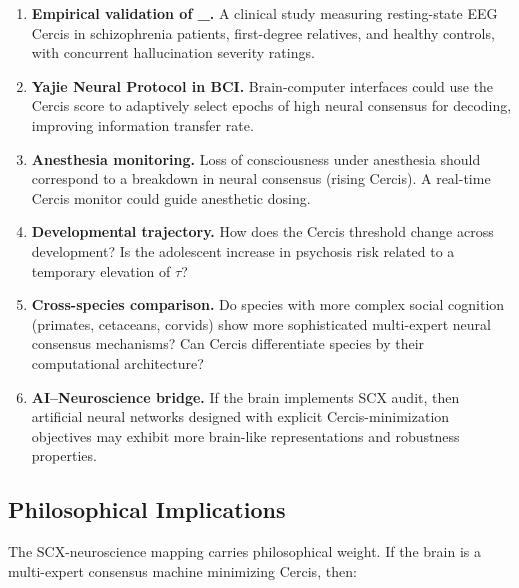 \documentclass[12pt,a4paper]{article}
\theoremstyle{remark}
\newcommand{\Cercis}{\textsf{Cercis}}
\newcommand{\SchizoScore}{\mathcal{S}_{\text{schizo}}}
\begin{document}
\begin{enumerate}[label=(\roman*)]
    \item \textbf{Empirical validation of \SchizoScore{}.}
          A clinical study measuring resting-state EEG \Cercis{} in
          schizophrenia patients, first-degree relatives, and healthy controls,
          with concurrent hallucination severity ratings.
    \item \textbf{Yajie Neural Protocol in BCI.}
          Brain-computer interfaces could use the \Cercis{} score to
          adaptively select epochs of high neural consensus for decoding,
          improving information transfer rate.
    \item \textbf{Anesthesia monitoring.}
          Loss of consciousness under anesthesia should correspond to a
          breakdown in neural consensus (rising \Cercis{}). A real-time
          \Cercis{} monitor could guide anesthetic dosing.
    \item \textbf{Developmental trajectory.}
          How does the \Cercis{} threshold change across development? Is the
          adolescent increase in psychosis risk related to a temporary
          elevation of $\tau$?
    \item \textbf{Cross-species comparison.}
          Do species with more complex social cognition (primates, cetaceans,
          corvids) show more sophisticated multi-expert neural consensus
          mechanisms? Can \Cercis{} differentiate species by their
          computational architecture?
    \item \textbf{AI--Neuroscience bridge.}
          If the brain implements SCX audit, then artificial neural networks
          designed with explicit \Cercis{}-minimization objectives may exhibit
          more brain-like representations and robustness properties.
\end{enumerate}

\subsection{Philosophical Implications}

The SCX-neuroscience mapping carries philosophical weight. If the brain is a
multi-expert consensus machine minimizing \Cercis{}, then:
\end{document}

